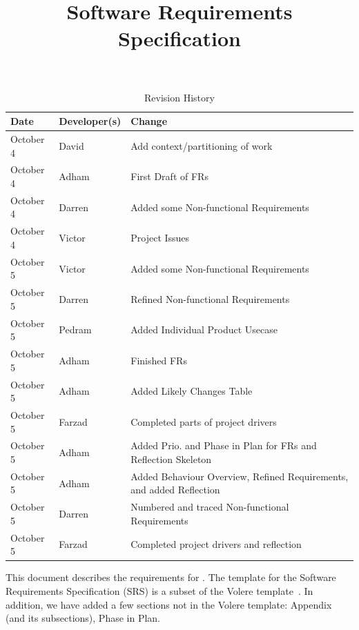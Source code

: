 \documentclass[12pt]{article}
\title{Software Requirements Specification\\\progname}
\author{\authname}
\date{}
\begin{document}
\maketitle

\newpage
{}

\tableofcontents

\newpage

\begin{table}[hp]
\caption{Revision History} \label{TblRevisionHistory}
\begin{tabularx}{\textwidth}{llX}
\toprule
\textbf{Date} & \textbf{Developer(s)} & \textbf{Change}\\
\midrule
October 4 & David & Add context/partitioning of work\\
\midrule
October 4 & Adham & First Draft of FRs\\
\midrule
October 4 & Darren & Added some Non-functional Requirements\\
\midrule
October 4 & Victor & Project Issues\\
\midrule
October 5 & Victor & Added some Non-functional Requirements\\
\midrule
October 5 & Darren & Refined Non-functional Requirements\\
\midrule
October 5 & Pedram & Added Individual Product Usecase\\
\midrule
October 5 & Adham & Finished FRs\\
\midrule
October 5 & Adham & Added Likely Changes Table\\
\midrule
October 5 & Farzad & Completed parts of project drivers\\
\midrule
October 5 & Adham & Added Prio. and Phase in Plan for FRs and Reflection Skeleton\\
\midrule
October 5 & Adham & Added Behaviour Overview, Refined Requirements, and added Reflection\\
\midrule
October 5 & Darren & Numbered and traced Non-functional Requirements\\
\midrule
October 5 & Farzad & Completed project drivers and reflection\\
\bottomrule
\end{tabularx}
\end{table}

\newpage

\listoftables
\listoffigures

\newpage


This document describes the requirements for \progname. The template for the Software
Requirements Specification (SRS) is a subset of the Volere
template~\cite{RobertsonAndRobertson2012}. In addition, we have added a few sections not
in the Volere template: Appendix (and its subsections), Phase in Plan.
\end{document}
